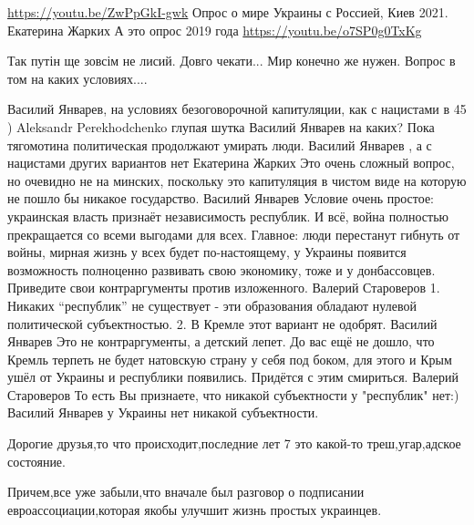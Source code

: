 \begin{itemize}

\url{https://youtu.be/ZwPpGkI-gwk}
Опрос о мире Украины с Россией, Киев 2021. Екатерина Жарких
А это опрос 2019 года \url{https://youtu.be/o7SP0g0TxKg}

Так путін ще зовсім не лисий. Довго чекати...
Мир конечно же нужен. Вопрос в том на каких условиях....

\begin{itemize}

Василий Январев, на условиях безоговорочной капитуляции, как с нацистами в 45 )
Aleksandr Perekhodchenko глупая шутка
Василий Январев на каких?
Пока тягомотина политическая продолжают умирать люди.
Василий Январев , а с нацистами других вариантов нет
Екатерина Жарких Это очень сложный вопрос, но очевидно не на минских, поскольку
это капитуляция в чистом виде на которую не пошло бы никакое государство.
Василий Январев Условие очень простое: украинская власть признаёт независимость
республик. И всё, война полностью прекращается со всеми выгодами для всех.
Главное: люди перестанут гибнуть от войны, мирная жизнь у всех будет
по-настоящему, у Украины появится возможность полноценно развивать свою
экономику, тоже и у донбассовцев. Приведите свои контраргументы против
изложенного.
Валерий Староверов 1. Никаких \enquote{республик} не существует - эти образования обладают нулевой политической субъектностью. 2. В Кремле этот вариант не одобрят.
Василий Январев Это не контраргументы, а детский лепет. До вас ещё не дошло,
что Кремль терпеть не будет натовскую страну у себя под боком, для этого и Крым
ушёл от Украины и республики появились. Придётся с этим смириться.
Валерий Староверов То есть Вы признаете, что никакой субъектности у "республик" нет:)
Василий Январев у Украины нет никакой субъектности.

\end{itemize}


Дорогие друзья,то что происходит,последние лет 7 это какой-то треш,угар,адское состояние.

Причем,все уже забыли,что вначале был разговор о подписании евроассоциации,которая якобы улучшит жизнь простых украинцев.


\end{itemize}
